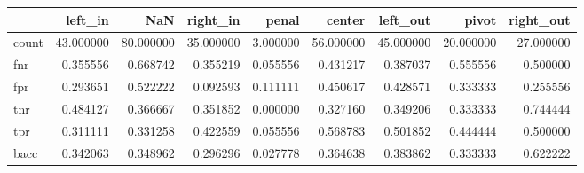 \begin{tabular}{lrrrrrrrr}
\toprule
{} &    left\_in &        NaN &   right\_in &     penal &     center &   left\_out &      pivot &  right\_out \\
\midrule
count &  43.000000 &  80.000000 &  35.000000 &  3.000000 &  56.000000 &  45.000000 &  20.000000 &  27.000000 \\
fnr   &   0.355556 &   0.668742 &   0.355219 &  0.055556 &   0.431217 &   0.387037 &   0.555556 &   0.500000 \\
fpr   &   0.293651 &   0.522222 &   0.092593 &  0.111111 &   0.450617 &   0.428571 &   0.333333 &   0.255556 \\
tnr   &   0.484127 &   0.366667 &   0.351852 &  0.000000 &   0.327160 &   0.349206 &   0.333333 &   0.744444 \\
tpr   &   0.311111 &   0.331258 &   0.422559 &  0.055556 &   0.568783 &   0.501852 &   0.444444 &   0.500000 \\
bacc  &   0.342063 &   0.348962 &   0.296296 &  0.027778 &   0.364638 &   0.383862 &   0.333333 &   0.622222 \\
\bottomrule
\end{tabular}

